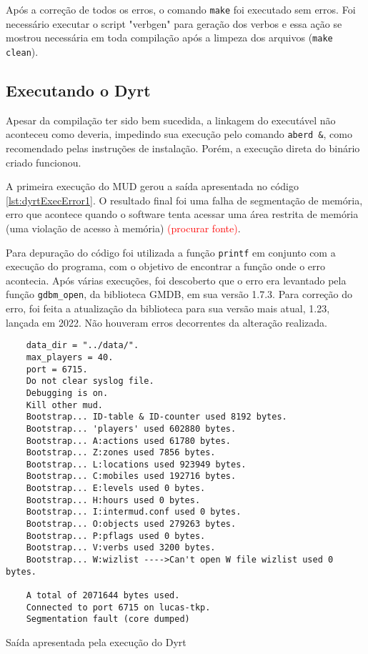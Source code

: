 Após a correção de todos os erros, o comando \verb|make| foi executado sem erros. Foi necessário 
executar o script "verbgen" para geração dos verbos e essa ação se mostrou necessária em toda compilação 
após a limpeza dos arquivos (\verb|make clean|).

\subsection{Executando o Dyrt}

Apesar da compilação ter sido bem sucedida, a linkagem do executável não aconteceu como deveria, 
impedindo sua execução pelo comando \verb|aberd &|, como recomendado pelas instruções de instalação. 
Porém, a execução direta do binário criado funcionou.

A primeira execução do MUD gerou a saída apresentada no código \ref{lst:dyrtExecError1}. O resultado final 
foi uma falha de segmentação de memória, erro que acontece quando o software tenta acessar uma área 
restrita de memória (uma violação de acesso à memória) \textcolor{red}{(procurar fonte)}. 

Para depuração do código foi utilizada a função \verb|printf| em conjunto com a execução do programa, 
com o objetivo de encontrar a função onde o erro acontecia. Após várias execuções, foi descoberto que o 
erro era levantado pela função \verb|gdbm_open|, da biblioteca GMDB, em sua versão 1.7.3. Para correção 
do erro, foi feita a atualização da biblioteca para sua versão mais atual, 1.23, lançada em 2022. Não 
houveram erros decorrentes da alteração realizada.

\begin{listing}[!ht]
    \begin{verbatim}
    data_dir = "../data/".
    max_players = 40.
    port = 6715.
    Do not clear syslog file.
    Debugging is on.
    Kill other mud.
    Bootstrap... ID-table & ID-counter used 8192 bytes.
    Bootstrap... 'players' used 602880 bytes.
    Bootstrap... A:actions used 61780 bytes.
    Bootstrap... Z:zones used 7856 bytes.
    Bootstrap... L:locations used 923949 bytes.
    Bootstrap... C:mobiles used 192716 bytes.
    Bootstrap... E:levels used 0 bytes.
    Bootstrap... H:hours used 0 bytes.
    Bootstrap... I:intermud.conf used 0 bytes.
    Bootstrap... O:objects used 279263 bytes.
    Bootstrap... P:pflags used 0 bytes.
    Bootstrap... V:verbs used 3200 bytes.
    Bootstrap... W:wizlist ---->Can't open W file wizlist used 0 bytes.
    
    A total of 2071644 bytes used.
    Connected to port 6715 on lucas-tkp.
    Segmentation fault (core dumped)
    \end{verbatim}
\caption{Saída apresentada pela execução do Dyrt}
\label{lst:dyrtExecError1}
\end{listing}

